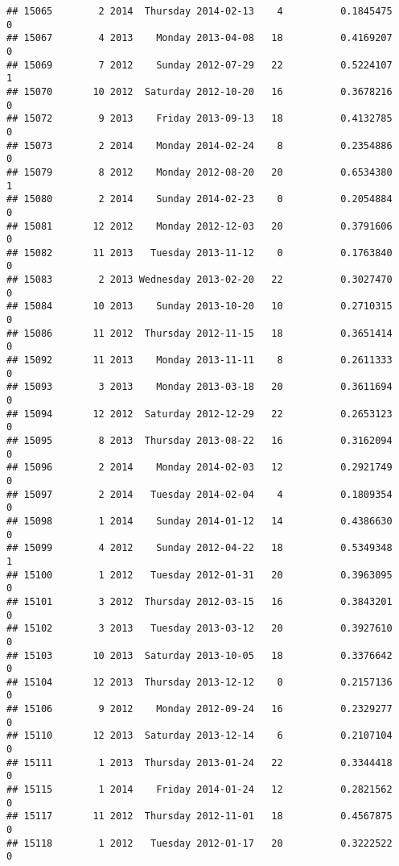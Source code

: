 \documentclass[
]{article}
\begin{document}
\begin{verbatim}
## 15065        2 2014  Thursday 2014-02-13    4          0.1845475             0
## 15067        4 2013    Monday 2013-04-08   18          0.4169207             0
## 15069        7 2012    Sunday 2012-07-29   22          0.5224107             1
## 15070       10 2012  Saturday 2012-10-20   16          0.3678216             0
## 15072        9 2013    Friday 2013-09-13   18          0.4132785             0
## 15073        2 2014    Monday 2014-02-24    8          0.2354886             0
## 15079        8 2012    Monday 2012-08-20   20          0.6534380             1
## 15080        2 2014    Sunday 2014-02-23    0          0.2054884             0
## 15081       12 2012    Monday 2012-12-03   20          0.3791606             0
## 15082       11 2013   Tuesday 2013-11-12    0          0.1763840             0
## 15083        2 2013 Wednesday 2013-02-20   22          0.3027470             0
## 15084       10 2013    Sunday 2013-10-20   10          0.2710315             0
## 15086       11 2012  Thursday 2012-11-15   18          0.3651414             0
## 15092       11 2013    Monday 2013-11-11    8          0.2611333             0
## 15093        3 2013    Monday 2013-03-18   20          0.3611694             0
## 15094       12 2012  Saturday 2012-12-29   22          0.2653123             0
## 15095        8 2013  Thursday 2013-08-22   16          0.3162094             0
## 15096        2 2014    Monday 2014-02-03   12          0.2921749             0
## 15097        2 2014   Tuesday 2014-02-04    4          0.1809354             0
## 15098        1 2014    Sunday 2014-01-12   14          0.4386630             0
## 15099        4 2012    Sunday 2012-04-22   18          0.5349348             1
## 15100        1 2012   Tuesday 2012-01-31   20          0.3963095             0
## 15101        3 2012  Thursday 2012-03-15   16          0.3843201             0
## 15102        3 2013   Tuesday 2013-03-12   20          0.3927610             0
## 15103       10 2013  Saturday 2013-10-05   18          0.3376642             0
## 15104       12 2013  Thursday 2013-12-12    0          0.2157136             0
## 15106        9 2012    Monday 2012-09-24   16          0.2329277             0
## 15110       12 2013  Saturday 2013-12-14    6          0.2107104             0
## 15111        1 2013  Thursday 2013-01-24   22          0.3344418             0
## 15115        1 2014    Friday 2014-01-24   12          0.2821562             0
## 15117       11 2012  Thursday 2012-11-01   18          0.4567875             0
## 15118        1 2012   Tuesday 2012-01-17   20          0.3222522             0

\end{verbatim}
\end{document}
